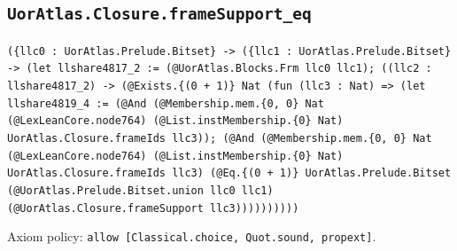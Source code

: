 \documentclass[11pt]{article}
\begin{document}
\subsection*{\texttt{UorAtlas.Closure.frameSupport\_eq}}
\noindent\texttt{(\{llc0 : UorAtlas.Prelude.Bitset\} -> (\{llc1 : UorAtlas.Prelude.Bitset\} -> (let llshare4817\_2 := (@UorAtlas.Blocks.Frm llc0 llc1); ((llc2 : llshare4817\_2) -> (@Exists.\{(0 + 1)\} Nat (fun (llc3 : Nat) => (let llshare4819\_4 := (@And (@Membership.mem.\{0, 0\} Nat (@LexLeanCore.node764) (@List.instMembership.\{0\} Nat) UorAtlas.Closure.frameIds llc3)); (@And (@Membership.mem.\{0, 0\} Nat (@LexLeanCore.node764) (@List.instMembership.\{0\} Nat) UorAtlas.Closure.frameIds llc3) (@Eq.\{(0 + 1)\} UorAtlas.Prelude.Bitset (@UorAtlas.Prelude.Bitset.union llc0 llc1) (@UorAtlas.Closure.frameSupport llc3))))))))))}\par
\noindent Axiom policy: \texttt{allow [Classical.choice, Quot.sound, propext]}.\par
\end{document}
